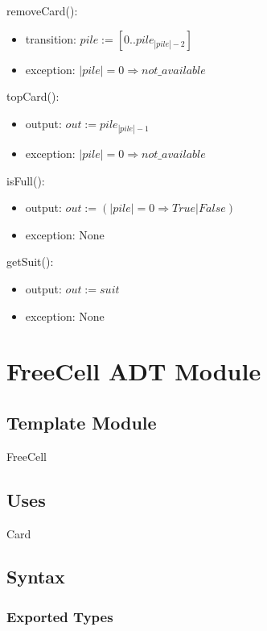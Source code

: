 \documentclass[12pt]{article}
\begin{document}
\noindent removeCard():
\begin{itemize}
\item transition: $pile := [0 .. pile_{|pile|-2}] $
\item exception: $|pile| = 0 \Rightarrow not\_available$
\end{itemize}

\noindent topCard():
\begin{itemize}
\item output: $out := pile_{|pile|-1}$
\item exception: $|pile| = 0 \Rightarrow not\_available$
\end{itemize}

\noindent isFull():
\begin{itemize}
\item output: $out := (|pile| = 0 \Rightarrow True | False)$
\item exception: None
\end{itemize}

\noindent getSuit():
\begin{itemize}
\item output: $out := suit$
\item exception: None
\end{itemize}

\newpage

\section* {FreeCell ADT Module}

\subsection*{Template Module}

FreeCell

\subsection* {Uses}

Card

\subsection* {Syntax}

\subsubsection* {Exported Types}
\end{document}
